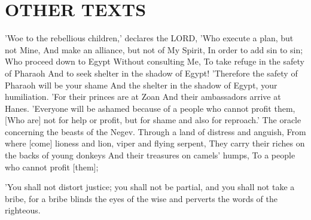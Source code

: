 \section{OTHER TEXTS}

\begin{scripture}[Isaiah 30:1-6]
    'Woe to the rebellious children,' declares the LORD, 'Who execute a plan, but not Mine, And make an alliance, but not of My Spirit, In order to add sin to sin;
    Who proceed down to Egypt Without consulting Me, To take refuge in the safety of Pharaoh And to seek shelter in the shadow of Egypt!
    'Therefore the safety of Pharaoh will be your shame And the shelter in the shadow of Egypt, your humiliation.
    'For their princes are at Zoan And their ambassadors arrive at Hanes.
    'Everyone will be ashamed because of a people who cannot profit them, [Who are] not for help or profit, but for shame and also for reproach.'
    The oracle concerning the beasts of the Negev. Through a land of distress and anguish, From where [come] lioness and lion, viper and flying serpent, They carry their riches on the backs of young donkeys And their treasures on camels' humps, To a people who cannot profit [them];
\end{scripture}

\begin{scripture}[Deuteronomy 16:19]
    'You shall not distort justice; you shall not be partial, and you shall not take a bribe, for a bribe blinds the eyes of the wise and perverts the words of the righteous.
\end{scripture}

